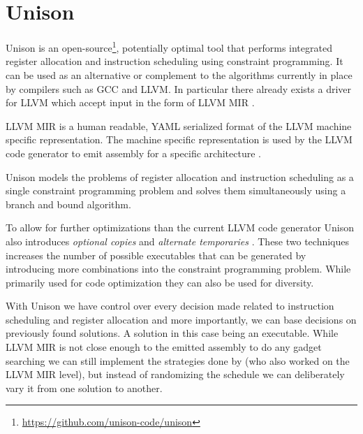 \section{Unison}
\label{sec:unison}

Unison is an open-source\footnote{\url{https://github.com/unison-code/unison}},
potentially optimal tool that performs integrated register allocation and instruction
scheduling using constraint programming. It can be used as an alternative or complement to
the algorithms currently in place by compilers such as GCC and LLVM. In particular there
already exists a driver for LLVM which accept input in the form of LLVM MIR \cite{unison-docs}.

LLVM MIR is a human readable, YAML serialized format of the LLVM machine specific
representation\cite{llvm-mir-lang-ref}. The machine specific representation is used by the
LLVM code generator to emit assembly for a specific architecture \cite{welcome-to-backend}.

Unison models the problems of register allocation and instruction scheduling as a single
constraint programming problem and solves them simultaneously using a branch and bound
algorithm\cite{unison-docs,reg-alloc-inst-sched-uni,unison-src}.

To allow for further optimizations than the current LLVM code generator Unison also
introduces \textit{optional copies} and \textit{alternate temporaries}
\cite{reg-alloc-inst-sched}. These two techniques increases the number of possible executables
that can be generated by introducing more combinations into the constraint programming
problem. While primarily used for code optimization they can also be used for diversity.

With Unison we have control over every decision made related to instruction scheduling and
register allocation and more importantly, we can base decisions on previously found solutions.
A solution in this case being an executable. While LLVM MIR is not close enough to the
emitted assembly to do any gadget searching we can still implement the strategies done by
\textcite{large-scale-automated} (who also worked on the LLVM MIR level), but instead of
randomizing the schedule we can deliberately vary it from one solution to another.
